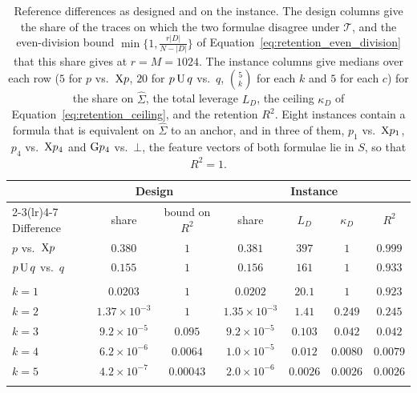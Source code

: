 \documentclass[titlepage,a4paper,11pt]{report}
\begin{document}
    \begin{table}[ht]
        \centering
        \caption{Reference differences as designed and on the instance. The design columns give the share of the traces on which the two formulae disagree under $\mathcal T$, and the even-division bound $\min\{1,\frac{r|D|}{N-|D|}\}$ of Equation~\eqref{eq:retention_even_division} that this share gives at $r=M=1024$. The instance columns give medians over each row ($5$ for $p$ vs.\ $\text{X} p$, $20$ for $p\,\text{U}\,q$ vs.\ $q$, $\binom5k$ for each $k$ and $5$ for each $c$) for the share on $\widehat\Sigma$, the total leverage $L_D$, the ceiling $\kappa_D$ of Equation~\eqref{eq:retention_ceiling}, and the retention $R^2$. Eight instances contain a formula that is equivalent on $\widehat\Sigma$ to an anchor, and in three of them, $p_1$ vs.\ $\text{X} p_1$, $p_4$ vs.\ $\text{X} p_4$ and $\text{G} p_4$ vs.\ $\bot$, the feature vectors of both formulae lie in $S$, so that $R^2=1$.}
        \label{tab:geom_reference}
        \begin{tabular}{lcccccc}
            \toprule
            & \multicolumn{2}{c}{Design} & \multicolumn{4}{c}{Instance} \\
            \cmidrule(lr){2-3}\cmidrule(lr){4-7}
            Difference & share & bound on $R^2$ & share & $L_D$ & $\kappa_D$ & $R^2$ \\
            \midrule
            $p$ vs.\ $\text{X} p$ & $0.380$ & $1$ & $0.381$ & $397$ & $1$ & $0.999$ \\
            $p\,\text{U}\,q$ vs.\ $q$ & $0.155$ & $1$ & $0.156$ & $161$ & $1$ & $0.933$ \\
            \addlinespace
            \multicolumn{7}{l}{$\G(p_1\land\dots\land p_k)$ vs.\ $\bot$} \\
            \quad $k=1$ & $0.0203$ & $1$ & $0.0202$ & $20.1$ & $1$ & $0.923$ \\
            \quad $k=2$ & $1.37\times10^{-3}$ & $1$ & $1.35\times10^{-3}$ & $1.41$ & $0.249$ & $0.245$ \\
            \quad $k=3$ & $9.2\times10^{-5}$ & $0.095$ & $9.2\times10^{-5}$ & $0.103$ & $0.042$ & $0.042$ \\
            \quad $k=4$ & $6.2\times10^{-6}$ & $0.0064$ & $1.0\times10^{-5}$ & $0.012$ & $0.0080$ & $0.0079$ \\
            \quad $k=5$ & $4.2\times10^{-7}$ & $0.00043$ & $2.0\times10^{-6}$ & $0.0026$ & $0.0026$ & $0.0026$ \\
            \addlinespace
            \multicolumn{7}{l}{$\F(p_1\lor\dots\lor p_k)$ vs.\ $\top$} \\

\end{tabular}
\end{table}
\end{document}
